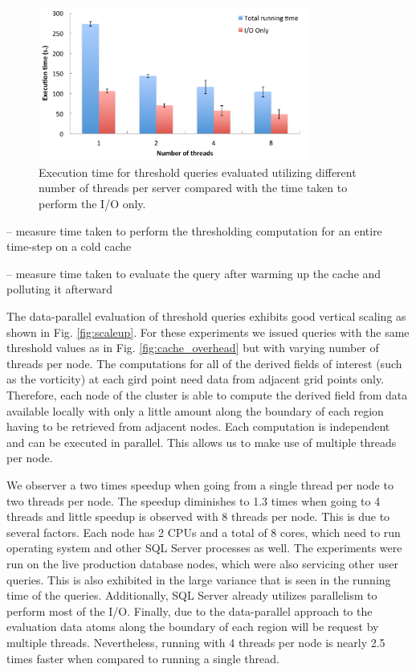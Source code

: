 \documentclass{sig-alternate}
\newcommand{\kk}[1]{{\color{blue}{\it KK: #1}}}
\begin{document}
\begin{figure}
\centering
\includegraphics[width=3.5in]{Figures/io_comparison.pdf}
\caption{Execution time for threshold queries evaluated utilizing different number of
threads per server compared with the time taken to perform the I/O only.}
\label{fig:io_comparison}
\end{figure}

-- measure time taken to perform the thresholding computation for an entire time-step on a cold cache

-- measure time taken to evaluate the query after warming up the cache and polluting it afterward

The data-parallel evaluation of threshold queries exhibits good vertical scaling as shown in Fig. \ref{fig:scaleup}. For these experiments we issued queries
with the same threshold values as in Fig. \ref{fig:cache_overhead} but with varying number of threads per node. The computations for all of 
the derived fields of interest (such as the vorticity) at each gird point need data from adjacent grid points only. Therefore, each node of the cluster is able to
compute the derived field from data available locally with only a little amount along the boundary of each region having to be retrieved from adjacent nodes.
Each computation is independent and can be executed in parallel. This allows us to make use of multiple threads per node. 

We observer a two times speedup when going from a single thread per node to two threads per node. The speedup diminishes to 1.3 times when going 
to 4 threads and little speedup is 
observed with 8 threads per node. This is due to several factors. Each node has 2 CPUs and a total of 8 cores, which need to run operating system and other SQL Server
processes as well. The experiments were run on the live production database nodes, which were also servicing other user queries. This is also exhibited in
the large variance that is seen in the running time of the queries. Additionally, SQL
Server already utilizes parallelism to perform most of the I/O. Finally, due to the data-parallel approach to the evaluation data atoms along the boundary of
each region will be request by multiple threads. Nevertheless, running with 4 threads per node is nearly 2.5 times faster when compared to running a single
thread.
\kk{Should we have scale-out experiments as well?}
\end{document}
